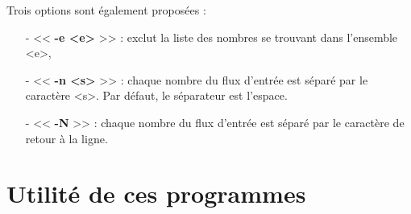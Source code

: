 \begin{itemize}
\begin{itemize}
\end{itemize}
Trois options sont \'egalement propos\'ees :
\begin{itemize}
 \item[-] << \textbf{-e <e>} >> : exclut la liste des nombres se trouvant dans l'ensemble <e>,
 \item[-] << \textbf{-n <s>} >> : chaque nombre du flux d'entr\'ee est s\'epar\'e par le caract\`ere <s>. Par d\'efaut, le s\'eparateur est l'espace.
 \item[-] << \textbf{-N} >> : chaque nombre du flux d'entr\'ee est s\'epar\'e par le caract\`ere de retour \`a la ligne.
\end{itemize}
\end{itemize}

\section{Utilit\'e de ces programmes}


